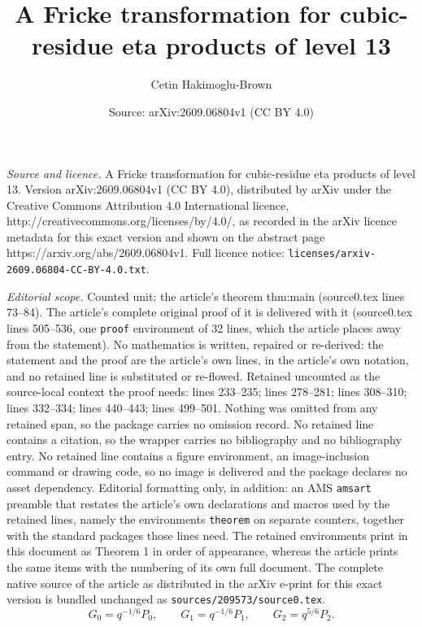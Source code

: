 \documentclass[10pt,a4paper]{amsart}
\title{A Fricke transformation for cubic-residue eta products of level 13}
\author{Cetin Hakimoglu-Brown}
\date{Source: arXiv:2609.06804v1 (CC BY 4.0)}
\begin{document}
\maketitle

\noindent\emph{Source and licence.} A Fricke transformation for cubic-residue eta products of level 13. Version arXiv:2609.06804v1 (CC BY 4.0), distributed by arXiv under the Creative Commons Attribution 4.0 International licence, http://creativecommons.org/licenses/by/4.0/, as recorded in the arXiv licence metadata for this exact version and shown on the abstract page https://arxiv.org/abs/2609.06804v1. Full licence notice: \texttt{licenses/arxiv-2609.06804-CC-BY-4.0.txt}.\par\smallskip

\noindent\textit{Editorial scope.} Counted unit: the article's theorem thm:main (source0.tex lines 73--84). The article's complete original proof of it is delivered with it (source0.tex lines 505--536, one \texttt{proof} environment of 32 lines, which the article places away from the statement). No mathematics is written, repaired or re-derived: the statement and the proof are the article's own lines, in the article's own notation, and no retained line is substituted or re-flowed.  Retained uncounted as the source-local context the proof needs: lines 233--235; lines 278--281; lines 308--310; lines 332--334; lines 440--443; lines 499--501.  Nothing was omitted from any retained span, so the package carries no omission record.  No retained line contains a citation, so the wrapper carries no bibliography and no bibliography entry.  No retained line contains a figure environment, an image-inclusion command or drawing code, so no image is delivered and the package declares no asset dependency.  Editorial formatting only, in addition: an AMS \texttt{amsart} preamble that restates the article's own declarations and macros used by the retained lines, namely the environments \texttt{theorem} on separate counters, together with the standard packages those lines need.  The retained environments print in this document as Theorem 1 in order of appearance, whereas the article prints the same items with the numbering of its own full document.  The complete native source of the article as distributed in the arXiv e-print for this exact version is bundled unchanged as \texttt{sources/209573/source0.tex}.
\begin{equation}\label{eq:normalization}
 G_0=q^{-1/6}P_0,\qquad G_1=q^{-1/6}P_1,\qquad G_2=q^{5/6}P_2.
\end{equation}
\end{document}
